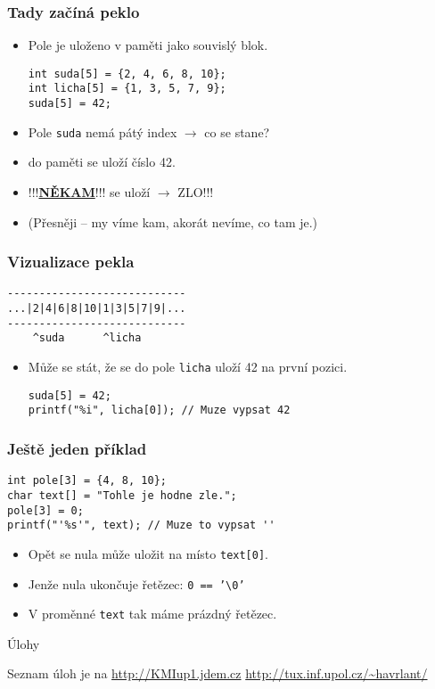 \documentclass{beamer}
\newenvironment{itemizex}%
  {\large \begin{itemize}%
    \setlength{\itemsep}{8pt}%
    \setlength{\parskip}{8pt}}%
  {\end{itemize}}
\begin{document}
\begin{frame}[t,fragile]\frametitle{Tady začíná peklo} 
    \begin{itemizex}
        \item Pole je uloženo v paměti jako souvislý blok. 
        \begin{verbatim} 
int suda[5] = {2, 4, 6, 8, 10};
int licha[5] = {1, 3, 5, 7, 9};
suda[5] = 42;
        \end{verbatim}
        \item Pole \texttt{suda} nemá pátý index $\longrightarrow$ co se stane?
        \item {} do paměti se uloží číslo 42.
        \item !!!\underline{\textbf{NĚKAM}}!!! se uloží $\longrightarrow$ ZLO!!!
        \item (Přesněji -- my víme kam, akorát nevíme, co tam je.)
    \end{itemizex}
\end{frame}


\begin{frame}[t,fragile]\frametitle{Vizualizace pekla} 
\begin{verbatim} 
----------------------------
...|2|4|6|8|10|1|3|5|7|9|...
----------------------------
    ^suda      ^licha
\end{verbatim}
    \begin{itemizex}
        \item Může se stát, že se do pole \texttt{licha} uloží 42 na první pozici.
        \begin{verbatim} 
suda[5] = 42;
printf("%i", licha[0]); // Muze vypsat 42
        \end{verbatim}
    \end{itemizex}
\end{frame}


\begin{frame}[t,fragile]\frametitle{Ještě jeden příklad}
\begin{verbatim} 
int pole[3] = {4, 8, 10};
char text[] = "Tohle je hodne zle.";
pole[3] = 0;
printf("'%s'", text); // Muze to vypsat ''
\end{verbatim}
    \begin{itemizex}
        \item Opět se nula může uložit na místo \texttt{text[0]}.
        \item Jenže nula ukončuje řetězec: \texttt{0 == '\textbackslash0'}
        \item V proměnné \texttt{text} tak máme prázdný řetězec.
    \end{itemizex}
\end{frame}


\begin{frame}[t,fragile]{Úlohy}
\begin{center}
\vskip 1cm
{\Large Seznam úloh je na \url{http://KMIup1.jdem.cz}}
\vskip 2cm
\url{http://tux.inf.upol.cz/~havrlant/}
\end{center}
\end{frame}
\end{document}
